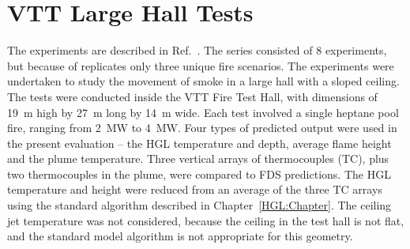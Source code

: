 \section{VTT Large Hall Tests}
\label{VTT_Description}

The experiments are described in Ref.~\cite{Hostikka:VTT2104}. The series consisted of 8 experiments, but because of replicates only three unique fire scenarios. The experiments were undertaken to study the movement of smoke in a large hall with a sloped ceiling. The tests were conducted inside the VTT Fire Test Hall, with dimensions of 19~m high by 27~m long by 14~m wide. Each test involved a single heptane pool fire, ranging from 2~MW to 4~MW. Four types of predicted output were used in the present evaluation -- the HGL temperature and depth, average flame height and the plume temperature. Three vertical arrays of thermocouples (TC), plus two thermocouples in the plume, were compared to FDS predictions. The HGL temperature and height were reduced from an average of the three TC arrays using the standard algorithm described in Chapter~\ref{HGL:Chapter}. The ceiling jet temperature was not considered, because the ceiling in the test hall is not flat, and the standard model algorithm is not appropriate for this geometry.

